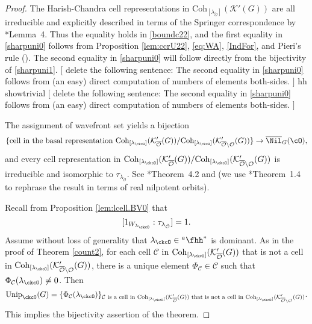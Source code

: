 \documentclass[12pt,a4paper]{amsart}
\newcommand{\trivial}[2][]{\if\relax\detokenize{#1}\relax
  {%
      \color{orange} \vspace{0em} $[$  #2 $]$
      \color{black}
  }
  \else
\ifx#1h
\ifcsname showtrivial\endcsname
{%
    \color{orange} \vspace{0em}  $[$ #2 $]$
    \color{black}
}
\fi
\else {\red Wrong argument!} \fi
\fi
}
\newcommand{\CC}{{\mathcal {C}}}
\newcommand{\CK}{{\mathcal {K}}}
\newcommand{\CO}{{\mathcal {O}}}
\numberwithin{equation}{section}
\theoremstyle{remark}
\def\Unip{\mathrm{Unip}}
\def\Cint#1{\Coh_{[#1]}}
\def\hha{{}^a\fhh}
\def\Coh{\mathrm{Coh}}
\begin{document}
\begin{proof} The Harish-Chandra cell representations in $\Coh_{[\lambda_{\check \CO}]}(\CK'(G))$  are all irreducible and explicitly
  described in terms of the Springer correspondence by \cite{Bo}*{Lemma~4}. Thus the equality holds in \eqref{boundc22}, and the first equality  in \eqref{sharpuni0}
  follows from Proposition \ref{lem:ccrU22}, \eqref{eq:WA},  \eqref{IndFor}, and Pieri's rule (\cite[Corollary 9.2.4]{GW}).
  The second equality in \eqref{sharpuni0} will follow directly from
  the bijectivity of \eqref{sharpuni1}.
  \trivial[h]{
  {delete the following sentence: }
  The second equality in \eqref{sharpuni0}
  follows from (an easy) direct computation of numbers of elements both-sides.
  }

The assignment of wavefront set yields a bijection 
 \[
   \{\textrm{cell in the basal representation $\Cint{\lambda_\ckcO}(\CK_{\overline{\CO}}'(G))/\Cint{\lambda_\ckcO}(\CK_{\overline{\CO}\setminus \CO}'(G))$}\} \rightarrow \overline \Nil_{G}(\cO),
 \]
and every cell representation in  $\Cint{\lambda_\ckcO}(\CK_{\overline{\CO}}'(G))/\Cint{\lambda_\ckcO}(\CK_{\overline{\CO}\setminus \CO}'(G))$ is irreducible and isomorphic to $\tau_{\lambda_{\check \CO}}$. See \cite{BV.W}*{Theorem~4.2} and
  \cite[Theorem 5]{Bo} (we use \cite{SV}*{Theorem~1.4} to rephrase the result in
  terms of real nilpotent orbits).
 
 Recall from Proposition \ref{lem:lcell.BV0}  that 
 \[
 [1_{W_{\lambda_{\ckcO}}} : \tau_{\lambda_{\check \CO}}]=1. 
 \]
 Assume without loss of generality that $\lambda_{\ckcO}\in \hha^*$ is dominant. As in the proof of Theorem \ref{count2},  for each cell $\CC$ in $\Cint{\lambda_\ckcO}(\CK_{\overline{\CO}}'(G))$ that is not a cell in $\Cint{\lambda_\ckcO}(\CK_{\overline{\CO}\setminus \CO}'(G))$, there is a unique element $\Phi_\CC\in \CC$ such that $ \Phi_\CC(\lambda_{\ckcO})\neq 0$.  
 Then
 \[
    \Unip_{\ckcO}(G) =\{ \Phi_\CC(\lambda_{\ckcO})\}_{\CC\textrm{ is a cell  in $\Cint{\lambda_\ckcO}(\CK_{\overline{\CO}}'(G))$ that is not a cell in $\Cint{\lambda_\ckcO}(\CK_{\overline{\CO}\setminus \CO}'(G))$}}.
 \]
 This implies the bijectivity assertion of the theorem.   %
\end{proof}
\end{document}
